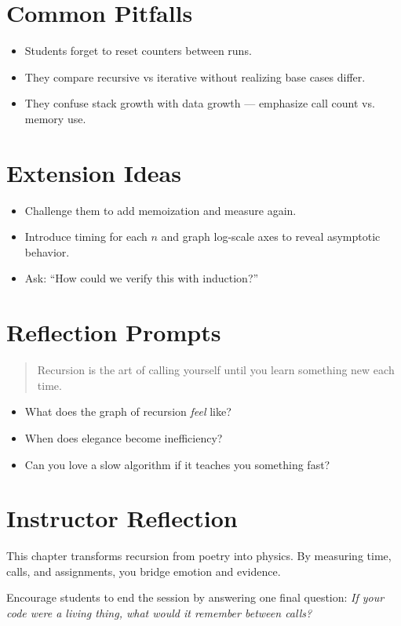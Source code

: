 \section{Common Pitfalls}
\begin{itemize}
  \item Students forget to reset counters between runs.
  \item They compare recursive vs iterative without realizing base cases differ.
  \item They confuse stack growth with data growth — emphasize call count vs. memory use.
\end{itemize}

\section{Extension Ideas}
\begin{itemize}
  \item Challenge them to add memoization and measure again.
  \item Introduce timing for each $n$ and graph log-scale axes to reveal asymptotic behavior.
  \item Ask: “How could we verify this with induction?”
\end{itemize}

\section{Reflection Prompts}
\begin{quote}
Recursion is the art of calling yourself until you learn something new each time.
\end{quote}

\begin{itemize}
  \item What does the graph of recursion \emph{feel} like?
  \item When does elegance become inefficiency?
  \item Can you love a slow algorithm if it teaches you something fast?
\end{itemize}

\section{Instructor Reflection}
This chapter transforms recursion from poetry into physics. By measuring time, calls, and assignments, you bridge emotion and evidence.

Encourage students to end the session by answering one final question:
\textit{If your code were a living thing, what would it remember between calls?}

